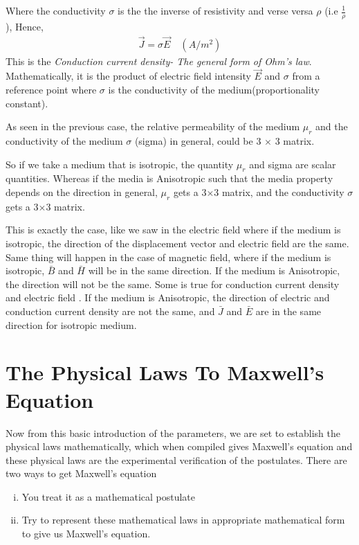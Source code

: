 Where the conductivity $ \sigma $ is the the inverse of resistivity and verse versa $ \rho $  (i.e $ \frac{1}{\rho} $ ), Hence, 
\begin{align}
\boxed{\vec{J} = \sigma \vec{E}}\quad (A/m^{2})
\end{align}
This is the \emph{Conduction current density- The general form of Ohm's law}. Mathematically, it is the product of electric field intensity $\vec{E}$ and $\sigma$ from a reference point where $\sigma$ is the conductivity of the medium(proportionality constant).

As seen in the previous case, the relative permeability of the medium $ \mu_r $ and the conductivity of the medium $ \sigma $ (sigma) in general, could be 3 $ \times $ 3 matrix.

So if we take a medium that is isotropic, the quantity $ \mu_r$ and sigma are scalar quantities. Whereas if the media is Anisotropic such that the media property depends on the direction in general, $ \mu_r $ gets a 3$ \times $3 matrix,  and the conductivity $ \sigma $ gets a 3$ \times $3 matrix.

This is exactly the case, like we saw in the electric field where if the medium is isotropic, the direction of the displacement vector and electric field are the same. Same thing will happen in the case of magnetic field, where if the medium is isotropic, $ \bar{B}$ and $ \bar{H}$ will be in the same direction. If the medium is Anisotropic, the direction will not be the same. Some is true for conduction current density and electric field . If the medium is Anisotropic, the direction of electric and conduction current density are not the same, and $ \bar{J} $ and $\bar{E}$ are in the same direction  for isotropic medium. 

\section{The Physical Laws To Maxwell's Equation}
Now from this basic introduction of the parameters, we are set to establish the physical laws mathematically, which when compiled gives Maxwell's equation and these physical laws are the experimental verification of the postulates. There are two ways to get Maxwell's equation
\begin{enumerate}[(i)]
\item You treat it as a mathematical postulate
\item Try to represent these mathematical laws in appropriate mathematical form to give us Maxwell's equation.
\end{enumerate}

